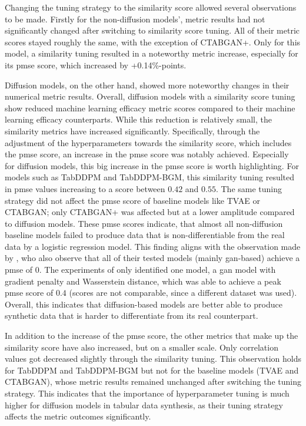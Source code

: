Changing the tuning strategy to the similarity score allowed several observations to be made.
Firstly for the non-diffusion models', metric results had not significantly changed after switching to similarity score tuning.
All of their metric scores stayed roughly the same, with the exception of CTABGAN+.
Only for this \gls{model}, a similarity tuning resulted in a noteworthy metric increase, especially for its \gls{pmse} score, which increased by +0.14\%-points.

Diffusion models, on the other hand, showed more noteworthy changes in their numerical metric results.
Overall, diffusion models with a similarity score tuning show reduced machine learning efficacy metric scores compared to their machine learning efficacy counterparts.
While this reduction is relatively small, the similarity metrics have increased significantly.
Specifically, through the adjustment of the hyperparameters towards the similarity score, which includes the \gls{pmse} score, an increase in the \gls{pmse} score was notably achieved.
Especially for diffusion models, this big increase in the \gls{pmse} score is worth highlighting.
For models such as TabDDPM and TabDDPM-BGM, this similarity tuning resulted in \gls{pmse} values increasing to a score between $0.42$ and $0.55$.
The same tuning strategy did not affect the \gls{pmse} score of baseline models like TVAE or CTABGAN; only CTABGAN+ was affected but at a lower amplitude compared to diffusion models.
These \gls{pmse} scores indicate, that almost all non-diffusion baseline models failed to produce data that is non-differentiable from the real data by a logistic regression \gls{model}.
This finding aligns with the observation made by \textcite{chundawat2022UniversalMetricRobust}, who also observe that all of their tested models (mainly \gls{gan}-based) achieve a \gls{pmse} of 0.
The experiments of \textcite{chundawat2022UniversalMetricRobust} only identified one \gls{model}, a \gls{gan} \gls{model} with gradient penalty and Wasserstein distance, which was able to achieve a peak \gls{pmse} score of $0.4$ (scores are not comparable, since a different dataset was used).
Overall, this indicates that diffusion-based models are better able to produce synthetic data that is harder to differentiate from its real counterpart.

In addition to the increase of the \gls{pmse} score, the other metrics that make up the similarity score have also increased, but on a smaller scale.
Only correlation values got decreased slightly through the similarity tuning.
This observation holds for TabDDPM and TabDDPM-BGM but not for the baseline models (TVAE and CTABGAN), whose metric results remained unchanged after switching the tuning strategy.
This indicates that the importance of hyperparameter tuning is much higher for diffusion models in tabular data synthesis, as their tuning strategy affects the metric outcomes significantly.

